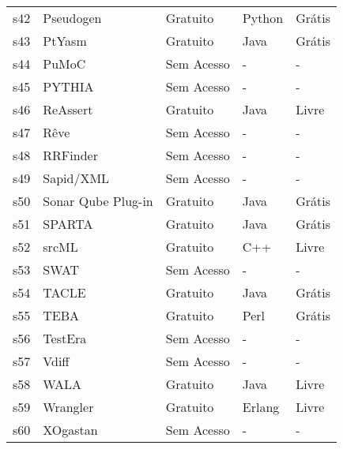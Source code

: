 \begin{longtable}{l l l l l}
    s42 &
      Pseudogen &
      Gratuito &
      Python &
      Grátis \\
    s43 &
      PtYasm &
      Gratuito &
      Java &
      Grátis \\
    s44 &
      PuMoC &
      Sem Acesso &
      - &
      - \\
    s45 &
      PYTHIA &
      Sem Acesso &
      - &
      - \\
    s46 &
      ReAssert &
      Gratuito &
      Java &
      Livre \\
    s47 &
      Rêve &
      Sem Acesso &
      - &
      - \\
    s48 &
      RRFinder &
      Sem Acesso &
      - &
      - \\
    s49 &
      Sapid/XML &
      Sem Acesso &
      - &
      - \\
    s50 &
      Sonar Qube Plug-in &
      Gratuito &
      Java &
      Grátis \\
    s51 &
      SPARTA &
      Gratuito &
      Java &
      Grátis \\
    s52 &
      srcML &
      Gratuito &
      C++ &
      Livre \\
    s53 &
      SWAT &
      Sem Acesso &
      - &
      - \\
    s54 &
      TACLE &
      Gratuito &
      Java &
      Grátis \\
    s55 &
      TEBA &
      Gratuito &
      Perl &
      Grátis \\
    s56 &
      TestEra &
      Sem Acesso &
      - &
      - \\
    s57 &
      Vdiff &
      Sem Acesso &
      - &
      - \\
    s58 &
      WALA &
      Gratuito &
      Java &
      Livre \\
    s59 &
      Wrangler &
      Gratuito &
      Erlang &
      Livre \\
    s60 &
      XOgastan &
      Sem Acesso &
      - &
      - \\
  \hline
\end{longtable}
